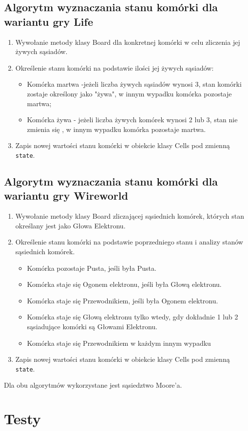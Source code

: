 \documentclass[10pt, oneside]{article}
\begin{document}
\subsection{ Algorytm wyznaczania stanu komórki dla wariantu gry Life}
	\begin {enumerate}
	\item Wywołanie metody klasy Board dla konkretnej komórki w celu zliczenia jej żywych sąsiadów.
	\item Określenie stanu komórki na podstawie ilości jej żywych sąsiadów:
		\begin{itemize}
		\item Komórka martwa -jeżeli  liczba żywych sąsiadów wynosi 3, stan komórki zostaje określony jako "żywa", w innym wypadku komórka pozostaje martwa;
		\item Komórka żywa - jeżeli liczba żywych komórek wynosi 2 lub 3, stan nie zmienia się , w innym wypadku komórka pozostaje martwa.
		\end{itemize}
	\item Zapis nowej wartości stanu komórki w obiekcie klasy Cells pod zmienną \texttt{state}.
	\end {enumerate}


\subsection { Algorytm wyznaczania stanu komórki dla wariantu gry Wireworld}
	\begin {enumerate}
		\item Wywołanie metody klasy Board zliczającej sąsiednich komórek, których stan określany jest jako Głowa Elektronu. 
		\item Określenie stanu komórki na podstawie poprzedniego stanu i analizy stanów sąsiednich komórek.
		\begin{itemize}
		\item Komórka pozostaje Pusta, jeśli była Pusta.
		\item Komórka staje się Ogonem elektronu, jeśli była Głową elektronu.
		\item Komórka staje się Przewodnikiem, jeśli była Ogonem elektronu.
		\item Komórka staje się Głową elektronu tylko wtedy, gdy dokładnie 1 lub 2 sąsiadujące komórki są Głowami Elektronu.
		\item Komórka staje się Przewodnikiem w każdym innym wypadku
	\end{itemize}
	\item Zapis nowej wartości stanu komórki w obiekcie klasy Cells pod zmienną \texttt{state}.
	
\end {enumerate}
Dla obu algorytmów wykorzystane jest sąsiedztwo Moore'a. 


\section {Testy}
\end{document}
